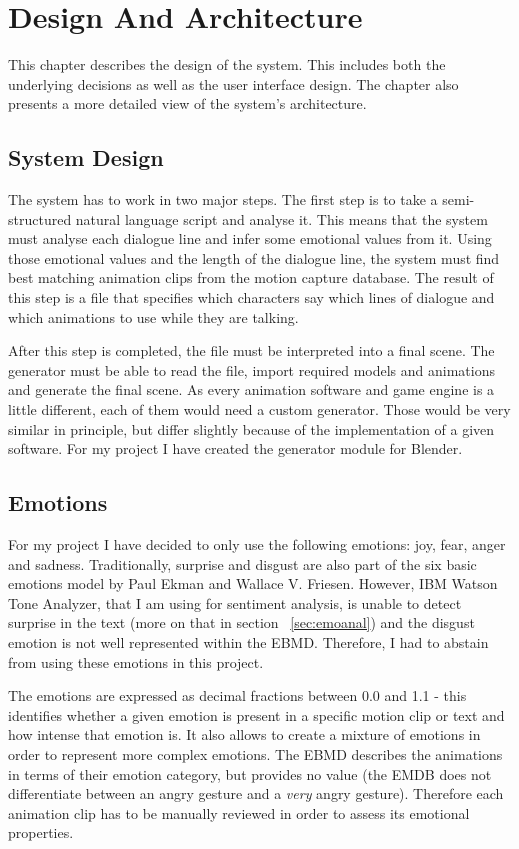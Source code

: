 \chapter{Design And Architecture\label{chap:design}}

This chapter describes the design of the system. This includes both the underlying decisions as well as the user interface design. The chapter also presents a more detailed view of the system's architecture.

\section{System Design}

The system has to work in two major steps. The first step is to take a semi-structured natural language script and analyse it. This means that the system must analyse each dialogue line and infer some emotional values from it. Using those emotional values and the length of the dialogue line, the system must find best matching animation clips from the motion capture database. The result of this step is a file that specifies which characters say which lines of dialogue and which animations to use while they are talking.

After this step is completed, the file must be interpreted into a final scene. The generator must be able to read the file, import required models and animations and generate the final scene. As every animation software and game engine is a little different, each of them would need a custom generator. Those would be very similar in principle, but differ slightly because of the implementation of a given software. For my project I have created the generator module for Blender.


\section{Emotions}

For my project I have decided to only use the following emotions: joy, fear, anger and sadness. Traditionally, surprise and disgust are also part of the six basic emotions model by Paul Ekman and Wallace V. Friesen. However, IBM Watson Tone Analyzer, that I am using for sentiment analysis, is unable to detect surprise in the text (more on that in section ~\ref{sec:emoanal}) and the disgust emotion is not well represented within the EBMD. Therefore, I had to abstain from using these emotions in this project. 

The emotions are expressed as decimal fractions between 0.0 and 1.1 - this identifies whether a given emotion is present in a specific motion clip or text and how intense that emotion is. It also allows to create a mixture of emotions in order to represent more complex emotions. The EBMD describes the animations in terms of their emotion category, but provides no value (the EMDB does not differentiate between an angry gesture and a \textit{very} angry gesture). Therefore each animation clip has to be manually reviewed in order to assess its emotional properties.

